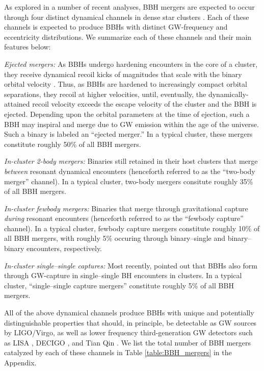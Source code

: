 \documentclass[twocolumn,tighten]{aastex63}
\begin{document}
As explored in a number of recent analyses, BBH mergers are expected to occur through four distinct dynamical channels in dense star clusters \citep{Samsing2018a,D'Orazio2018,Rodriguez2018b,Zevin2018,Kremer2019b}. Each of these channels is expected to produce BBHs with distinct GW-frequency and eccentricity distributions. We summarize each of these channels and their main features below:

\textit{Ejected mergers:} As BBHs undergo hardening encounters in the core of a cluster, they receive dynamical recoil kicks of magnitudes that scale with the binary orbital velocity \citep[e.g.,][]{Rodriguez2016a}. Thus, as BBHs are hardened to increasingly compact orbital separations, they recoil at higher velocities, until, eventually, the dynamically-attained recoil velocity exceeds the escape velocity of the cluster and the BBH is ejected. Depending upon the orbital parameters at the time of ejection, such a BBH may inspiral and merge due to GW emission within the age of the universe. Such a binary is labeled an ``ejected merger.'' In a typical cluster, these mergers constitute roughly 50\% of all BBH mergers.

\textit{In-cluster 2-body mergers:} Binaries still retained in their host clusters that merge  \textit{between} resonant dynamical encounters (henceforth referred to as the ``two-body merger'' channel). In a typical cluster, two-body mergers consitute roughly 35\% of all BBH mergers.

\textit{In-cluster fewbody mergers:} Binaries that merge through gravitational capture \textit{during} resonant encounters (henceforth referred to as the ``fewbody capture'' channel). In a typical cluster, fewbody capture mergers constitute roughly 10\% of all BBH mergers, with roughly 5\% occuring through binary--single and binary--binary encounters, respectively.

\textit{In-cluster single--single captures:} Most recently, \citet{Samsing2019_singlesingle} pointed out that BBHs also form through GW-capture in single--single BH encounters in clusters. In a typical cluster, ``single--single capture mergers'' constitute roughly 5\% of all BBH mergers.

All of the above dynamical channels produce BBHs with unique and potentially distinguishable properties that should, in principle, be detectable as GW sources by LIGO/Virgo, as well as lower frequency third-generation GW detectors such as LISA \citep{LISA2017}, DECIGO \citep{DECIGO2011,DECIGO2018}, and Tian Qin \citep{TianQin2016}. We list the total number of BBH mergers catalyzed by each of these channels in Table \ref{table:BBH_mergers} in the Appendix. 
\end{document}

